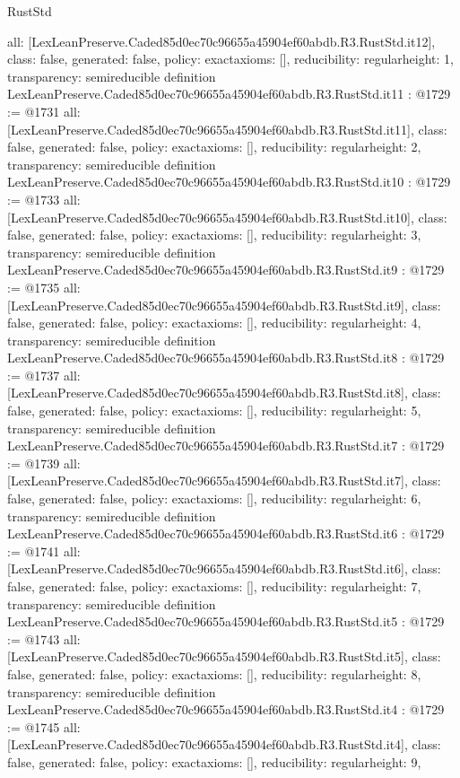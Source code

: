 \begin{lexlean}{RustStd}
\begin{coremodule}
{  all: [LexLeanPreserve.Caded85d0ec70c96655a45904ef60abdb.R3.RustStd.it12],
  class: false,
  generated: false,
  policy: exact{axioms: []},
  reducibility: regular{height: 1},
  transparency: semireducible
}
definition LexLeanPreserve.Caded85d0ec70c96655a45904ef60abdb.R3.RustStd.it11 : @1729 := @1731 {
  all: [LexLeanPreserve.Caded85d0ec70c96655a45904ef60abdb.R3.RustStd.it11],
  class: false,
  generated: false,
  policy: exact{axioms: []},
  reducibility: regular{height: 2},
  transparency: semireducible
}
definition LexLeanPreserve.Caded85d0ec70c96655a45904ef60abdb.R3.RustStd.it10 : @1729 := @1733 {
  all: [LexLeanPreserve.Caded85d0ec70c96655a45904ef60abdb.R3.RustStd.it10],
  class: false,
  generated: false,
  policy: exact{axioms: []},
  reducibility: regular{height: 3},
  transparency: semireducible
}
definition LexLeanPreserve.Caded85d0ec70c96655a45904ef60abdb.R3.RustStd.it9 : @1729 := @1735 {
  all: [LexLeanPreserve.Caded85d0ec70c96655a45904ef60abdb.R3.RustStd.it9],
  class: false,
  generated: false,
  policy: exact{axioms: []},
  reducibility: regular{height: 4},
  transparency: semireducible
}
definition LexLeanPreserve.Caded85d0ec70c96655a45904ef60abdb.R3.RustStd.it8 : @1729 := @1737 {
  all: [LexLeanPreserve.Caded85d0ec70c96655a45904ef60abdb.R3.RustStd.it8],
  class: false,
  generated: false,
  policy: exact{axioms: []},
  reducibility: regular{height: 5},
  transparency: semireducible
}
definition LexLeanPreserve.Caded85d0ec70c96655a45904ef60abdb.R3.RustStd.it7 : @1729 := @1739 {
  all: [LexLeanPreserve.Caded85d0ec70c96655a45904ef60abdb.R3.RustStd.it7],
  class: false,
  generated: false,
  policy: exact{axioms: []},
  reducibility: regular{height: 6},
  transparency: semireducible
}
definition LexLeanPreserve.Caded85d0ec70c96655a45904ef60abdb.R3.RustStd.it6 : @1729 := @1741 {
  all: [LexLeanPreserve.Caded85d0ec70c96655a45904ef60abdb.R3.RustStd.it6],
  class: false,
  generated: false,
  policy: exact{axioms: []},
  reducibility: regular{height: 7},
  transparency: semireducible
}
definition LexLeanPreserve.Caded85d0ec70c96655a45904ef60abdb.R3.RustStd.it5 : @1729 := @1743 {
  all: [LexLeanPreserve.Caded85d0ec70c96655a45904ef60abdb.R3.RustStd.it5],
  class: false,
  generated: false,
  policy: exact{axioms: []},
  reducibility: regular{height: 8},
  transparency: semireducible
}
definition LexLeanPreserve.Caded85d0ec70c96655a45904ef60abdb.R3.RustStd.it4 : @1729 := @1745 {
  all: [LexLeanPreserve.Caded85d0ec70c96655a45904ef60abdb.R3.RustStd.it4],
  class: false,
  generated: false,
  policy: exact{axioms: []},
  reducibility: regular{height: 9},
}
\end{coremodule}
\end{lexlean}
